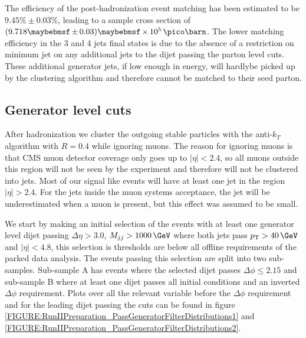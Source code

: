 

The efficiency of the post-hadronization event matching has been estimated to be $9.45\% \pm 0.03\%$, leading to a sample cross section of $(9.718 \pm 0.03) \times 10^5\,\pico\barn$. The lower matching efficiency in the 3 and 4 jets final states is due to the absence of a restriction on minimum jet \pt on any additional jets to the dijet passing the parton level cuts. These additional generator jets, if low enough in energy, will hardlybe picked up by the clustering algorithm and therefore cannot be matched to their seed parton.

\subsection{Generator level cuts}
\label{SUBSECTION:RunIIPreparation_GeneratorLevelCuts}


After hadronization we cluster the outgoing stable particles with the anti-$k_T$ algorithm with $R=0.4$ while ignoring muons. The reason for ignoring muons is that \gls{CMS} muon detector coverage only goes up to $|\eta|<2.4$, so all muons outside this region will not be seen by the experiment and therefore will not be clustered into jets. Most of our signal like events will have at least one jet in the region $|\eta|>2.4$. For the jets inside the muon systems acceptance, the jet \pt will be underestimated when a muon is present, but this effect was assumed to be small.

We start by making an initial selection of the events with at least one generator level dijet passing $\Delta\eta > 3.0$, $M_{jj} > 1000\,\GeV$ where both jets pass $\pt > 40\,\GeV$ and $|\eta|<4.8$, this selection is thresholds are below all offline requirements of the parked data analysis. The events passing this selection are split into two sub-samples. Sub-sample A has events where the selected dijet passes $\Delta\phi \leq 2.15$ and sub-sample B where at least one dijet passes all initial conditions and an inverted $\Delta\phi$ requirement. Plots over all the relevant variable before the $\Delta\phi$ requirement and for the leading dijet passing the cuts can be found in figure \ref{FIGURE:RunIIPreparation_PassGeneratorFilterDistributions1} and \ref{FIGURE:RunIIPreparation_PassGeneratorFilterDistributions2}.

